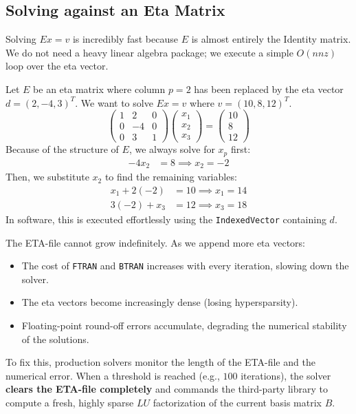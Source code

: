 \documentclass[11pt, a4paper]{article}
\begin{document}
\subsection{Solving against an Eta Matrix}

Solving $Ex = v$ is incredibly fast because $E$ is almost entirely the Identity matrix. We do not need a heavy linear algebra package; we execute a simple $O(nnz)$ loop over the eta vector.

\begin{example}[Solving $Ex = v$]
Let $E$ be an eta matrix where column $p=2$ has been replaced by the eta vector $d = (2, -4, 3)^T$. We want to solve $Ex = v$ where $v = (10, 8, 12)^T$.
\[
\begin{pmatrix} 1 & 2 & 0 \\ 0 & -4 & 0 \\ 0 & 3 & 1 \end{pmatrix}
\begin{pmatrix} x_1 \\ x_2 \\ x_3 \end{pmatrix}
=
\begin{pmatrix} 10 \\ 8 \\ 12 \end{pmatrix}
\]
Because of the structure of $E$, we always solve for $x_p$ first:
\begin{align*}
-4 x_2 &= 8 \implies x_2 = -2
\end{align*}
Then, we substitute $x_2$ to find the remaining variables:
\begin{align*}
x_1 + 2(-2) &= 10 \implies x_1 = 14 \\
3(-2) + x_3 &= 12 \implies x_3 = 18
\end{align*}
In software, this is executed effortlessly using the \texttt{IndexedVector} containing $d$.
\end{example}

\begin{warning}
The ETA-file cannot grow indefinitely. As we append more eta vectors:
\begin{itemize}[itemsep=2pt]
    \item The cost of \texttt{FTRAN} and \texttt{BTRAN} increases with every iteration, slowing down the solver.
    \item The eta vectors become increasingly dense (losing hypersparsity).
    \item Floating-point round-off errors accumulate, degrading the numerical stability of the solutions.
\end{itemize}
To fix this, production solvers monitor the length of the ETA-file and the numerical error. When a threshold is reached (e.g., $100$ iterations), the solver \textbf{clears the ETA-file completely} and commands the third-party library to compute a fresh, highly sparse $LU$ factorization of the current basis matrix $B$.
\end{warning}
\end{document}
